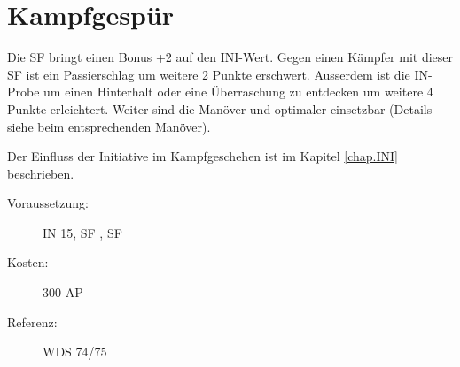 \section{Kampfgespür}
\label{sf.kampfgespuer}
Die SF  bringt einen Bonus +2 auf den INI-Wert.
Gegen einen Kämpfer mit dieser SF ist ein Passierschlag um weitere 2 Punkte erschwert.
Ausserdem ist die IN-Probe um einen Hinterhalt oder eine Überraschung zu entdecken um weitere 4 Punkte erleichtert.
Weiter sind die Manöver  und  optimaler einsetzbar (Details siehe beim entsprechenden Manöver).

Der Einfluss der Initiative im Kampfgeschehen ist im Kapitel \ref{chap.INI} beschrieben.
\begin{description}
    \item[Voraussetzung:]
        IN 15, SF , SF 
    \item [Kosten:]
        300 AP
    \item [Referenz:]
        WDS 74/75
\end{description}
